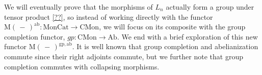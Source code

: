 \documentclass{amsbook} %
\newenvironment{eq*}{\begin{equation*}}{\end{equation*}}
\numberwithin{section}{chapter}
\begin{document}




 We will eventually prove that the morphisms of $L_n$ actually form a group under tensor product \cref{??}, so instead of working directly with the functor $\mathrm{M}(\, - \,)^{\mathrm{ab}}: \mathrm{MonCat} \to \mathrm{CMon}$, we will focus on its composite with the group completion functor, $gp : \mathrm{CMon} \to \mathrm{Ab}$. We end with a brief exploration of this new functor $\mathrm{M}(\, - \,)^{\mathrm{gp},\mathrm{ab}}$. 
It is well known that group completion and abelianization commute since their right adjoints commute, but we further note that group completion commutes with collapsing morphisms.
\end{document}
